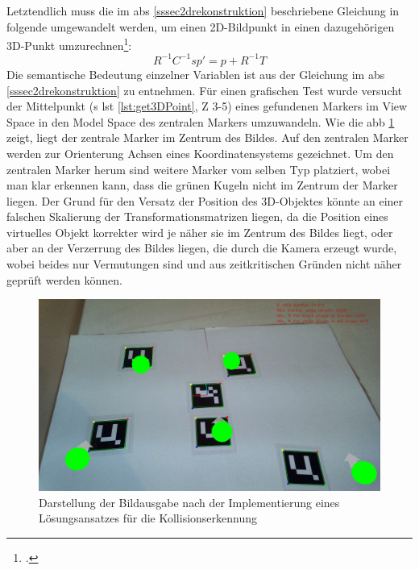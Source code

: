\newpage

\noindent Letztendlich muss die im \acs{abs} \ref{sssec2drekonstruktion} beschriebene Gleichung in folgende umgewandelt werden, um einen 2D-Bildpunkt in einen dazugehörigen 3D-Punkt umzurechnen\footcite{recontructioninverse}:
\Large $$R^{-1}C^{-1}sp' = p+R^{-1}T$$
\normalsize
Die semantische Bedeutung einzelner Variablen ist aus der Gleichung im \acs{abs} \ref{sssec2drekonstruktion} zu entnehmen. Für einen grafischen Test wurde versucht der Mittelpunkt (\acs{s} \acs{lst} \ref{lst:get3DPoint}, \acs{Z} 3-5) eines gefundenen Markers im View Space in den Model Space des zentralen Markers umzuwandeln. Wie die \acs{abb} \ref{fig:testing_failed} zeigt, liegt der zentrale Marker im Zentrum des Bildes. Auf den zentralen Marker werden zur Orienterung Achsen eines Koordinatensystems gezeichnet. Um den zentralen Marker herum sind weitere Marker vom selben Typ platziert, wobei man klar erkennen kann, dass die grünen Kugeln nicht im Zentrum der Marker liegen. Der Grund für den Versatz der Position des 3D-Objektes könnte an einer falschen Skalierung der Transformationsmatrizen liegen, da die Position eines virtuelles Objekt korrekter wird je näher sie im Zentrum des Bildes liegt, oder aber an der Verzerrung des Bildes liegen, die durch die Kamera erzeugt wurde, wobei beides nur Vermutungen sind und aus zeitkritischen Gründen nicht näher geprüft werden können.

\begin{figure}[H]
\centering
\includegraphics[width=15cm]{Bilder/Implementierung/testing_failed.png}
\caption{Darstellung der Bildausgabe nach der Implementierung eines Lösungsansatzes für die Kollisionserkennung}
\label{fig:testing_failed}
\end{figure}

\newpage